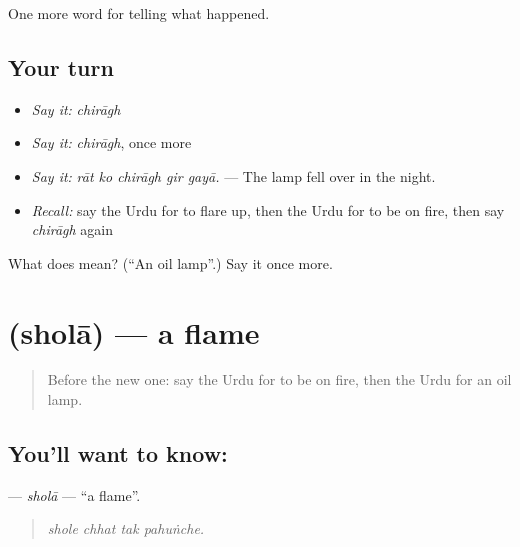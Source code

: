 \begin{grammarlens}[title={What you've built}]
One more word for telling what happened.
\end{grammarlens}

\subsection*{Your turn}
\begin{itemize}
\raggedright
  \item \emph{Say it:} \emph{chirāgh}
  \item \emph{Say it:} \emph{chirāgh}, once more
  \item \emph{Say it:} \emph{rāt ko chirāgh gir gayā.} — The lamp fell over in the night.
  \item \emph{Recall:} say the Urdu for to flare up, then the Urdu for to be on fire, then say \emph{chirāgh} again
\end{itemize}

\begin{tcolorbox}[breakable,colback=teal!4,colframe=teal!35!black,title={Before you move on}]
What does  mean? (\textquotedblleft{}An oil lamp\textquotedblright{}.) Say it once more.
\end{tcolorbox}
\section[\texorpdfstring{\ur{شعلہ} (sholā)}{شعلہ (sholā)}]{ (sholā) — a flame}

\label{lesson:UR-C288-shola}



\begin{quote}
Before the new one: say the Urdu for to be on fire, then the Urdu for an oil lamp.
\end{quote}

\subsection*{You'll want to know: }
\textbf{} — \emph{sholā} — \textquotedblleft{}a flame\textquotedblright{}.

\begin{quote}
   
\end{quote}

\begin{quote}
\emph{shole chhat tak pahuṅche.}
\end{quote}

